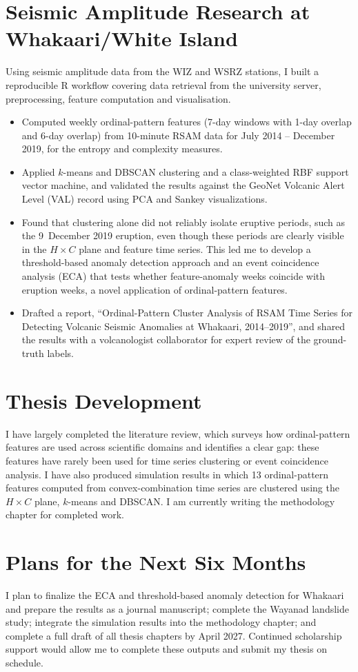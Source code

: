 \documentclass[11pt,a4paper]{article}
\begin{document}
	\section{Seismic Amplitude Research at Whakaari/White Island}
	
	Using seismic amplitude data from the WIZ and WSRZ stations, I built a
	reproducible R workflow covering data retrieval from the university
	server, preprocessing, feature computation and visualisation.
	
	\begin{itemize}
		\item Computed weekly ordinal-pattern features (7-day windows with 1-day
		overlap and 6-day overlap) from 10-minute RSAM data for July
		2014 -- December 2019, for the entropy and complexity measures.
		\item Applied $k$-means and DBSCAN clustering and a class-weighted RBF
		support vector machine, and validated the results against the
		GeoNet Volcanic Alert Level (VAL) record using PCA and Sankey
		visualizations.
		\item Found that clustering alone did not reliably isolate eruptive
		periods, such as the 9~December 2019 eruption, even though these
		periods are clearly visible in the $H\times C$ plane and feature
		time series. This led me to develop a threshold-based anomaly
		detection approach and an event coincidence analysis (ECA) that
		tests whether feature-anomaly weeks coincide with eruption weeks,
		a novel application of ordinal-pattern features.
		\item Drafted a report, ``Ordinal-Pattern Cluster Analysis of RSAM Time
		Series for Detecting Volcanic Seismic Anomalies at Whakaari,
		2014--2019'', and shared the results with a volcanologist
		collaborator for expert review of the ground-truth labels.
	\end{itemize}
	
	\section{Thesis Development}
	
	I have largely completed the literature review, which surveys how
	ordinal-pattern features are used across scientific domains and
	identifies a clear gap: these features have rarely been used for time
	series clustering or event coincidence analysis. I have also produced
	simulation results in which 13 ordinal-pattern features computed from
	convex-combination time series are clustered using the $H\times C$ plane,
	$k$-means and DBSCAN. I am currently writing the methodology chapter for
	completed work.
	
	\section{Plans for the Next Six Months}
	
	I plan to finalize the ECA and threshold-based anomaly detection for
	Whakaari and prepare the results as a journal manuscript; complete the
	Wayanad landslide study; integrate the simulation results into the
	methodology chapter; and complete a full draft of all thesis chapters by
	April 2027. Continued scholarship support would allow me to complete
	these outputs and submit my thesis on schedule.
	
\end{document}
